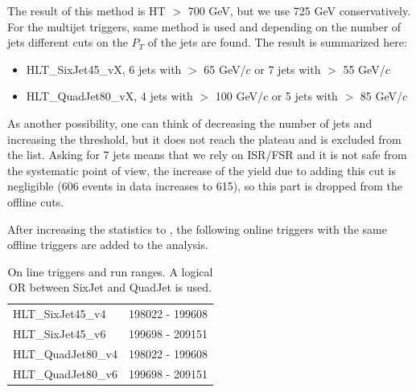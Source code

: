 The result of this method is HT $>$ 700 GeV, but we use 725 GeV conservatively. For the multijet triggers, same method is used and 
depending on the number of jets different cuts on the  $P_T$ of the jets are found. The result is summarized here:
\begin{itemize}
\item HLT\_SixJet45\_vX, 6 jets with \pT $>$ 65 GeV/$c$ or 7 jets with \pT $>$ 55 GeV/$c$
\item HLT\_QuadJet80\_vX, 4 jets with \pT $>$ 100 GeV/$c$ or 5 jets with \pT $>$ 85 GeV/$c$
\end{itemize}
As another possibility, one can think of decreasing the number of jets and increasing the \pT threshold, but it does not reach the
plateau and is excluded from the list.
Asking for 7 jets means that we rely on ISR/FSR and it is not safe from the systematic point of view, the increase of the yield due 
to adding this cut is negligible (606 events in data increases to 615), so this part is dropped from the offline cuts. 

After increasing the statistics to \IL, the following online triggers with the same offline triggers are added to the analysis.
\begin{table}[!htb]
\begin{center}
\caption{On line triggers and run ranges. A logical OR between SixJet and QuadJet is used.}
\label{Tab.TriggerPathsCnt}
\begin{tabular}{|l|c|}
\hline
HLT\_SixJet45\_v4  & 198022 - 199608\\
HLT\_SixJet45\_v6  & 199698 - 209151\\
HLT\_QuadJet80\_v4 & 198022 - 199608\\
HLT\_QuadJet80\_v6 & 199698 - 209151\\
\hline
\end{tabular}
\end{center}
\end{table}
